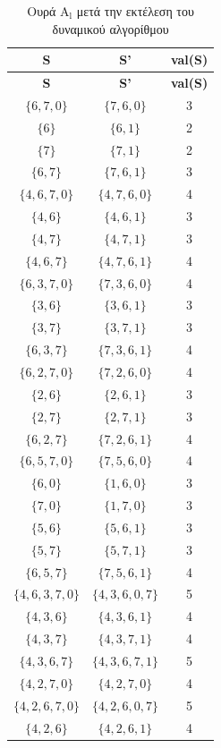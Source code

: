 \begin{longtable}{|c|c|c|}
	\caption{Ουρά $\text{Α}_{\text{l}}$ μετά την εκτέλεση του δυναμικού αλγορίθμου} \\
	\hline
	\textbf{S} & \textbf{S'} & \textbf{val(S)} \\
	\hline
	\endfirsthead %
	\hline
	\textbf{S} & \textbf{S'} & \textbf{val(S)} \\
	\hline
	\endhead %
	$\{6,7,0\}$ & $\{7,6,0\}$ & 3 \\
	$\{6\}$ & $\{6,1\}$ & 2 \\
	$\{7\}$ & $\{7,1\}$ & 2 \\
	$\{6,7\}$ & $\{7,6,1\}$ & 3 \\
	$\{4,6,7,0\}$ & $\{4,7,6,0\}$ & 4 \\
	$\{4,6\}$ & $\{4,6,1\}$ & 3 \\
	$\{4,7\}$ & $\{4,7,1\}$ & 3 \\
	$\{4,6,7\}$ & $\{4,7,6,1\}$ & 4 \\
	$\{6,3,7,0\}$ & $\{7,3,6,0\}$ & 4 \\
	$\{3,6\}$ & $\{3,6,1\}$ & 3 \\
	$\{3,7\}$ & $\{3,7,1\}$ & 3 \\
	$\{6,3,7\}$ & $\{7,3,6,1\}$ & 4 \\
	$\{6,2,7,0\}$ & $\{7,2,6,0\}$ & 4 \\
	$\{2,6\}$ & $\{2,6,1\}$ & 3 \\
	$\{2,7\}$ & $\{2,7,1\}$ & 3 \\
	$\{6,2,7\}$ & $\{7,2,6,1\}$ & 4 \\
	$\{6,5,7,0\}$ & $\{7,5,6,0\}$ & 4 \\
	$\{6,0\}$ & $\{1,6,0\}$ & 3 \\
	$\{7,0\}$ & $\{1,7,0\}$ & 3 \\
	$\{5,6\}$ & $\{5,6,1\}$ & 3 \\
	$\{5,7\}$ & $\{5,7,1\}$ & 3 \\
	$\{6,5,7\}$ & $\{7,5,6,1\}$ & 4 \\
	$\{4,6,3,7,0\}$ & $\{4,3,6,0,7\}$ & 5 \\
	$\{4,3,6\}$ & $\{4,3,6,1\}$ & 4 \\
	$\{4,3,7\}$ & $\{4,3,7,1\}$ & 4 \\
	$\{4,3,6,7\}$ & $\{4,3,6,7,1\}$ & 5 \\
	$\{4,2,7,0\}$ & $\{4,2,7,0\}$ & 4 \\
	$\{4,2,6,7,0\}$ & $\{4,2,6,0,7\}$ & 5 \\
	$\{4,2,6\}$ & $\{4,2,6,1\}$ & 4 \\

\end{longtable}
